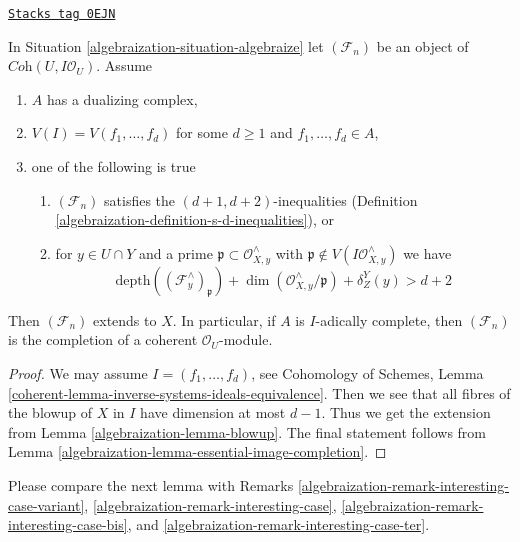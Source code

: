 \begin{proposition}

\label{algebraization-proposition-d-generators}
\href{https://stacks.math.columbia.edu/tag/0EJN}{\texttt{Stacks tag 0EJN}}

In Situation \ref{algebraization-situation-algebraize} let $(\mathcal{F}_n)$
be an object of $\textit{Coh}(U, I\mathcal{O}_U)$. Assume
\begin{enumerate}
\item $A$ has a dualizing complex,
\item $V(I) = V(f_1, \ldots, f_d)$ for some $d \geq 1$ and
$f_1, \ldots, f_d \in A$,
\item one of the following is true
\begin{enumerate}
\item $(\mathcal{F}_n)$ satisfies the $(d + 1, d + 2)$-inequalities
(Definition \ref{algebraization-definition-s-d-inequalities}), or
\item for $y \in U \cap Y$ and a prime
$\mathfrak p \subset \mathcal{O}_{X, y}^\wedge$ with
$\mathfrak p \not \in V(I\mathcal{O}_{X, y}^\wedge)$
we have
$$
\text{depth}((\mathcal{F}^\wedge_y)_\mathfrak p) +
\dim(\mathcal{O}_{X, y}^\wedge/\mathfrak p) + \delta^Y_Z(y) > d + 2
$$
\end{enumerate}
\end{enumerate}
Then $(\mathcal{F}_n)$ extends to $X$. In particular, if $A$ is
$I$-adically complete, then $(\mathcal{F}_n)$ is the completion
of a coherent $\mathcal{O}_U$-module.
\end{proposition}

\begin{proof}

We may assume $I = (f_1, \ldots, f_d)$, see
Cohomology of Schemes, Lemma
\ref{coherent-lemma-inverse-systems-ideals-equivalence}.
Then we see that
all fibres of the blowup of $X$ in $I$ have dimension at most $d - 1$.
Thus we get the extension from Lemma \ref{algebraization-lemma-blowup}.
The final statement follows from Lemma \ref{algebraization-lemma-essential-image-completion}.
\end{proof}

Please compare the next lemma with
Remarks \ref{algebraization-remark-interesting-case-variant},
\ref{algebraization-remark-interesting-case},
\ref{algebraization-remark-interesting-case-bis}, and
\ref{algebraization-remark-interesting-case-ter}.

